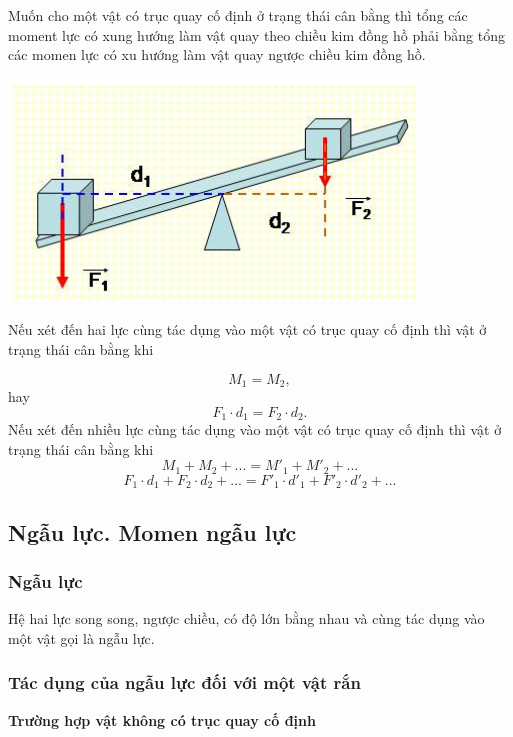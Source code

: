 Muốn cho một vật có trục quay cố định ở trạng thái cân bằng thì tổng các moment lực có xung hướng làm vật quay theo chiều kim đồng hồ phải bằng tổng các momen lực có xu hướng làm vật quay ngược chiều kim đồng hồ.

\begin{center}
	\includegraphics[scale=0.5]{../figs/VN10-PH-21-L-016-2-V2-01.png}
\end{center}

Nếu xét đến hai lực cùng tác dụng vào một vật có trục quay cố định thì vật ở trạng thái cân bằng khi

\begin{equation*}
	M_1 = M_2,
\end{equation*}
%
hay
%
\begin{equation*}
	F_1\cdot d_1 = F_2\cdot d_2. \label{eq2}
\end{equation*}
%
Nếu xét đến nhiều lực cùng tác dụng vào một vật có trục quay cố định thì vật ở trạng thái cân bằng khi
%
\begin{equation*}
	M_1+M_2+... = M'_1+M'_2+... 
\end{equation*}
%
\begin{equation*}
	F_1\cdot d_1+F_2\cdot d_2 + ... = F'_1\cdot d'_1 + F'_2\cdot d'_2+...
\end{equation*}
%
\subsection{Ngẫu lực. Momen ngẫu lực}
\subsubsection{Ngẫu lực}
Hệ hai lực song song, ngược chiều, có độ lớn bằng nhau và cùng tác dụng vào một vật gọi là ngẫu lực.
\subsubsection{Tác dụng của ngẫu lực đối với một vật rắn}
\textbf{Trường hợp vật không có trục quay cố định}

